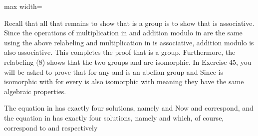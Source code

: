 \documentclass[11pt,oneside]{article}
\begin{document}
\begin{BookBody}
\begin{center}\begin{adjustbox}{max width=\linewidth}\end{adjustbox}\end{center}

\noindent Recall that all that remains to show that  is a group is to show that \BookInline{+ _{2\pi }} is associative. Since the operations of multiplication in  and addition modulo \BookInline{2\pi } in  are the same using the above relabeling and multiplication in  is associative, addition modulo \BookInline{2\pi } is also associative. This completes the proof that  is a group. Furthermore, the relabeling (8) shows that the two groups  and  are isomorphic. In Exercise 45, you will be asked to prove that for any  and  is an abelian group and  Since  is isomorphic with  for every  is also isomorphic with  meaning they have the same algebraic properties.

 The equation  in  has exactly four solutions, namely and  Now  and  correspond, and the equation  in  has exactly four solutions, namely and  which, of course, correspond to  and  respectively\BookEnd{\blacktriangle}


\end{BookBody}
\end{document}
